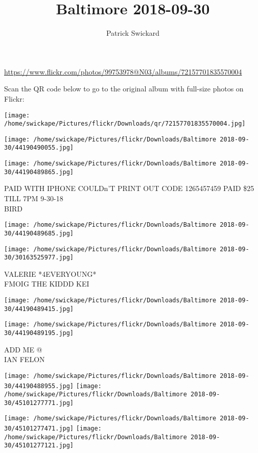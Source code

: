 \documentclass[10pt,letterpaper]{article}
\title{Baltimore 2018-09-30}
\author{Patrick Swickard}
\date{}
\begin{document}
\maketitle

\url{https://www.flickr.com/photos/99753978@N03/albums/72157701835570004}

Scan the QR code below to go to the original album with full-size photos on Flickr:

\texttt{[image: /home/swickape/Pictures/flickr/Downloads/qr/72157701835570004.jpg]}
\pagebreak

\texttt{[image: /home/swickape/Pictures/flickr/Downloads/Baltimore 2018-09-30/44190490055.jpg]}

\vspace{0.25in}
\texttt{[image: /home/swickape/Pictures/flickr/Downloads/Baltimore 2018-09-30/44190489865.jpg]}

PAID WITH IPHONE COULDn'T PRINT OUT CODE 1265457459 PAID \$25 TILL 7PM 9{-}30{-}18\\
BIRD
\pagebreak

\texttt{[image: /home/swickape/Pictures/flickr/Downloads/Baltimore 2018-09-30/44190489685.jpg]}

\vspace{0.25in}
\texttt{[image: /home/swickape/Pictures/flickr/Downloads/Baltimore 2018-09-30/30163525977.jpg]}

VALERIE *4EVERYOUNG*\\
FMOIG THE KIDDD KEI
\pagebreak

\texttt{[image: /home/swickape/Pictures/flickr/Downloads/Baltimore 2018-09-30/44190489415.jpg]}

\vspace{0.25in}
\texttt{[image: /home/swickape/Pictures/flickr/Downloads/Baltimore 2018-09-30/44190489195.jpg]}

ADD ME @\\
IAN FELON
\pagebreak

\texttt{[image: /home/swickape/Pictures/flickr/Downloads/Baltimore 2018-09-30/44190488955.jpg]}
\texttt{[image: /home/swickape/Pictures/flickr/Downloads/Baltimore 2018-09-30/45101277771.jpg]}

\texttt{[image: /home/swickape/Pictures/flickr/Downloads/Baltimore 2018-09-30/45101277471.jpg]}
\texttt{[image: /home/swickape/Pictures/flickr/Downloads/Baltimore 2018-09-30/45101277121.jpg]}
\end{document}
